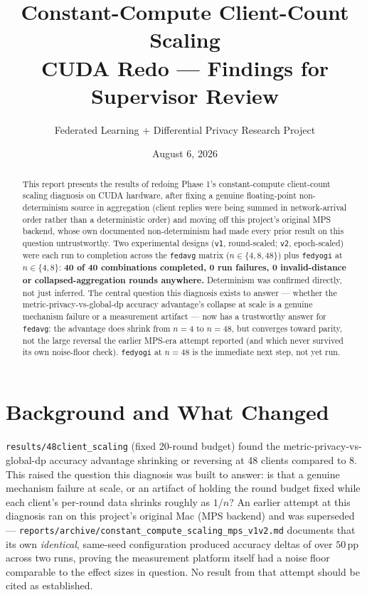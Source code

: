 \documentclass[11pt]{article}
\title{\textbf{Constant-Compute Client-Count Scaling}\\[0.2em]
\large CUDA Redo --- Findings for Supervisor Review}
\author{Federated Learning + Differential Privacy Research Project}
\date{August 6, 2026}
\newcommand{\code}[1]{\texttt{#1}}
\newcommand{\pp}{\,\text{pp}}
\begin{document}
\maketitle

\begin{abstract}
\noindent
This report presents the results of redoing Phase 1's constant-compute client-count scaling
diagnosis on CUDA hardware, after fixing a genuine floating-point non-determinism source in
aggregation (client replies were being summed in network-arrival order rather than a deterministic
order) and moving off this project's original MPS backend, whose own documented non-determinism had
made every prior result on this question untrustworthy. Two experimental designs (\code{v1},
round-scaled; \code{v2}, epoch-scaled) were each run to completion across the \code{fedavg} matrix
($n \in \{4,8,48\}$) plus \code{fedyogi} at $n \in \{4,8\}$: \textbf{40 of 40 combinations
completed, 0 run failures, 0 invalid-distance or collapsed-aggregation rounds anywhere.}
Determinism was confirmed directly, not just inferred. The central question this diagnosis exists
to answer --- whether the metric-privacy-vs-global-dp accuracy advantage's collapse at scale is a
genuine mechanism failure or a measurement artifact --- now has a trustworthy answer for
\code{fedavg}: the advantage does shrink from $n{=}4$ to $n{=}48$, but converges toward parity, not
the large reversal the earlier MPS-era attempt reported (and which never survived its own
noise-floor check). \code{fedyogi} at $n{=}48$ is the immediate next step, not yet run.
\end{abstract}

\tableofcontents

\section{Background and What Changed}

\code{results/48client\_scaling} (fixed 20-round budget) found the metric-privacy-vs-global-dp
accuracy advantage shrinking or reversing at 48 clients compared to 8. This raised the question this
diagnosis was built to answer: is that a genuine mechanism failure at scale, or an artifact of
holding the round budget fixed while each client's per-round data shrinks roughly as $1/n$? An
earlier attempt at this diagnosis ran on this project's original Mac (MPS backend) and was
superseded --- \code{reports/archive/constant\_compute\_scaling\_mps\_v1v2.md} documents that its
own \emph{identical}, same-seed configuration produced accuracy deltas of over $50\pp$ across two
runs, proving the measurement platform itself had a noise floor comparable to the effect sizes in
question. No result from that attempt should be cited as established.
\end{document}
